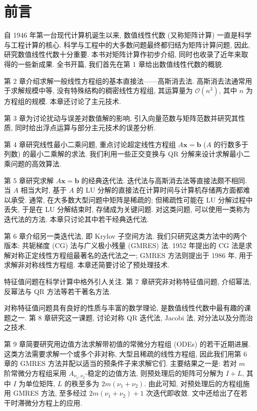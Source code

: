 \cleardoublepage
{}
\chapter*{前言}

自 1946 年第一台现代计算机诞生以来, 数值线性代数 (又称矩阵计算) 一直是科学与工程计算的核心. 科学与工程中的大多数问题最终都归结为矩阵计算问题, 因此, 研究数值线性代数十分重要. 本书对矩阵计算作初步介绍, 同时也收录了近年来取得的一些新成果. 全书开篇, 我们首先在第 1 章给出数值线性代数的概貌.

第 2 章介绍求解一般线性方程组的基本直接法——高斯消去法. 高斯消去法通常用于求解规模中等, 没有特殊结构的稠密线性方程组, 其运算量为 $\mathcal{O}(n^{3})$, 其中 $n$ 为方程组的规模. 本章还讨论了主元技术.

第 3 章为讨论扰动与误差对数值解的影响, 引入向量范数与矩阵范数并研究其性质, 同时给出浮点运算与部分主元技术的误差分析.

第 4 章研究线性最小二乘问题, 重点讨论超定线性方程组 $A\mathbf{x}=\mathbf{b}$ ($A$ 的行数多于列数) 的最小二乘解的求法. 我们利用一些正交变换与 QR 分解来设计求解最小二乘问题的高效算法.

第 5 章研究求解 $A\mathbf{x}=\mathbf{b}$ 的经典迭代法. 迭代法与高斯消去法等直接法颇不相同. 当 $A$ 相当大时, 基于 $A$ 的 LU 分解的直接法在计算时间与计算机存储两方面都难以承受. 通常, 在大多数大型问题中矩阵是稀疏的; 但稀疏性可能在 LU 分解过程中丢失, 于是在 LU 分解结束时, 存储成为关键问题. 对这类问题, 可以使用一类称为迭代法的方法. 本章只讨论其中若干经典迭代法.

第 6 章介绍另一类迭代法, 即 Krylov 子空间方法. 我们只研究这类方法中的两个版本: 共轭梯度 (CG) 法与广义极小残量 (GMRES) 法. 1952 年提出的 CG 法是求解对称正定线性方程组最著名的迭代法之一; GMRES 方法则提出于 1986 年, 用于求解非对称线性方程组. 本章还简要讨论了预处理技术.

特征值问题在科学计算中格外引人关注. 第 7 章研究非对称特征值问题, 介绍幂法, 反幂法与 QR 方法等若干著名方法.

对称特征值问题具有良好的性质与丰富的数学理论, 是数值线性代数中最有趣的课题之一. 第 8 章研究这一课题, 讨论对称 QR 迭代法, Jacobi 法, 对分法以及分而治之技术.

第 9 章简要研究用边值方法求解带初值的常微分方程组 (ODEs) 的若干近期进展. 这类方法需要求解一个或多个非对称, 大型且稀疏的线性方程组, 因此我们用第 6 章的 GMRES 方法并配以适当的预条件子来求解它们. 主要结果之一是: 若对 $m$ 阶常微分方程组采用 $A_{\nu_1,\nu_2}$-稳定的边值方法, 则预处理后的矩阵可分解为 $I+L$, 其中 $I$ 为单位矩阵, $L$ 的秩至多为 $2m(\nu_1+\nu_2)$. 由此可知, 对预处理后的方程组施用 GMRES 方法, 至多经过 $2m(\nu_1+\nu_2)+1$ 次迭代即收敛. 文中还给出了在若干时滞微分方程上的应用.

